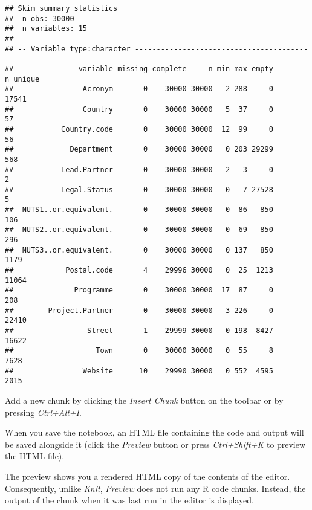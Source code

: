 \documentclass[]{article}
\begin{document}
\begin{verbatim}
## Skim summary statistics
##  n obs: 30000 
##  n variables: 15 
## 
## -- Variable type:character ------------------------------------------------------------------------------
##               variable missing complete     n min max empty n_unique
##                Acronym       0    30000 30000   2 288     0    17541
##                Country       0    30000 30000   5  37     0       57
##           Country.code       0    30000 30000  12  99     0       56
##             Department       0    30000 30000   0 203 29299      568
##           Lead.Partner       0    30000 30000   2   3     0        2
##           Legal.Status       0    30000 30000   0   7 27528        5
##  NUTS1..or.equivalent.       0    30000 30000   0  86   850      106
##  NUTS2..or.equivalent.       0    30000 30000   0  69   850      296
##  NUTS3..or.equivalent.       0    30000 30000   0 137   850     1179
##            Postal.code       4    29996 30000   0  25  1213    11064
##              Programme       0    30000 30000  17  87     0      208
##        Project.Partner       0    30000 30000   3 226     0    22410
##                 Street       1    29999 30000   0 198  8427    16622
##                   Town       0    30000 30000   0  55     8     7628
##                Website      10    29990 30000   0 552  4595     2015
\end{verbatim}

Add a new chunk by clicking the \emph{Insert Chunk} button on the
toolbar or by pressing \emph{Ctrl+Alt+I}.

When you save the notebook, an HTML file containing the code and output
will be saved alongside it (click the \emph{Preview} button or press
\emph{Ctrl+Shift+K} to preview the HTML file).

The preview shows you a rendered HTML copy of the contents of the
editor. Consequently, unlike \emph{Knit}, \emph{Preview} does not run
any R code chunks. Instead, the output of the chunk when it was last run
in the editor is displayed.
\end{document}
